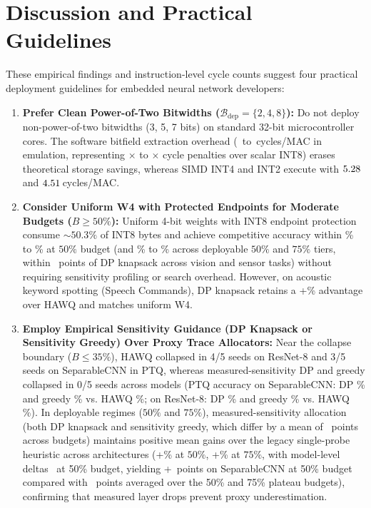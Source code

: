 \documentclass{ieeeaccess}
\begin{document}
\section{Discussion and Practical Guidelines}
\label{sec:discussion}
These empirical findings and instruction-level cycle counts suggest four practical deployment guidelines for embedded neural network developers:
\begin{enumerate}
    \item \textbf{Prefer Clean Power-of-Two Bitwidths ($\mathcal{B}_{\text{dep}} = \{2, 4, 8\}$):} Do not deploy non-power-of-two bitwidths (3, 5, 7 bits) on standard 32-bit microcontroller cores. The software bitfield extraction overhead (\MacroCyclesScalarUnpackLow\ to \MacroCyclesScalarUnpackHigh\,cycles/MAC in emulation, representing \MacroPenaltyScalarUnpackLow$\times$ to \MacroPenaltyScalarUnpackHigh$\times$ cycle penalties over scalar INT8) erases theoretical storage savings, whereas SIMD INT4 and INT2 execute with $5.28$ and $4.51$\,cycles/MAC.
    \item \textbf{Consider Uniform W4 with Protected Endpoints for Moderate Budgets ($B \ge 50\%$):} Uniform 4-bit weights with INT8 endpoint protection consume $\sim 50.3\%$ of INT8 bytes and achieve competitive accuracy within \MacroDPUniformWFourMinFifty\% to \MacroDPUniformWFourMaxFifty\% at $50\%$ budget (and \MacroDPUniformWFourMinCombined\% to \MacroDPUniformWFourMaxCombined\% across deployable $50\%$ and $75\%$ tiers, within \MacroDPUniformWFourAbsMaxCombined\ points of DP knapsack across vision and sensor tasks) without requiring sensitivity profiling or search overhead. However, on acoustic keyword spotting (Speech Commands), DP knapsack retains a +\MacroSpeechGainFifty\% advantage over HAWQ and matches uniform W4.
    \item \textbf{Employ Empirical Sensitivity Guidance (DP Knapsack or Sensitivity Greedy) Over Proxy Trace Allocators:} Near the collapse boundary ($B \le 35\%$), HAWQ collapsed in 4/5 seeds on ResNet-8 and 3/5 seeds on SeparableCNN in PTQ, whereas measured-sensitivity DP and greedy collapsed in 0/5 seeds across models (PTQ accuracy on SeparableCNN: DP \MacroSepCNNDPThirtyFivePTQ\% and greedy \MacroSepCNNGreedyThirtyFivePTQ\% vs. HAWQ \MacroSepCNNHAWQThirtyFivePTQ\%; on ResNet-8: DP \MacroResNetDPThirtyFivePTQ\% and greedy \MacroResNetGreedyThirtyFivePTQ\% vs. HAWQ \MacroResNetHAWQThirtyFivePTQ\%). In deployable regimes ($50\%$ and $75\%$), measured-sensitivity allocation (both DP knapsack and sensitivity greedy, which differ by a mean of \MacroDPGreedyDeltaMean\ points across budgets) maintains positive mean gains over the legacy single-probe heuristic across architectures (+\MacroStoryDPHAWQFifty\% at $50\%$, +\MacroStoryDPHAWQSeventyFive\% at $75\%$, with model-level deltas \MacroDPHAWQFiftyRange\ at 50\% budget, yielding +\MacroSepCNNGainFifty\ points on SeparableCNN at 50\% budget compared with \MacroMethodPlateauSepEffect\ points averaged over the 50\% and 75\% plateau budgets), confirming that measured layer drops prevent proxy underestimation.

\end{enumerate}
\end{document}
